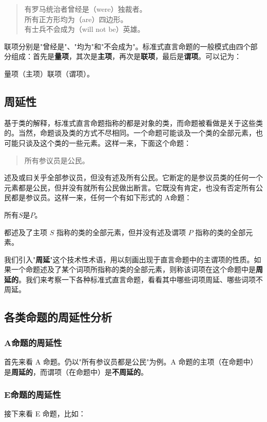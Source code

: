 \begin{quote}
有罗马统治者曾经是（were）独裁者。\\
所有正方形均为（are）四边形。\\
有士兵不会成为（will not be）英雄。
\end{quote}

联项分别是"曾经是"、"均为"和"不会成为"。标准式直言命题的一般模式由四个部分组成：首先是\textbf{量项}，其次是\textbf{主项}，再次是\textbf{联项}，最后是\textbf{谓项}。可以记为：

量项（主项）联项（谓项）。

\subsection{周延性}
基于类的解释，标准式直言命题指称的都是对象的类，而命题被看做是关于这些类的。当然，命题谈及类的方式不尽相同。一个命题可能谈及一个类的全部元素，也可能只谈及这个类的一些元素。这样一来，下面这个命题：

\begin{quote}
所有参议员是公民。
\end{quote}

述及或曰关乎全部参议员，但没有述及所有公民。它断定的是参议员类的任何一个元素都是公民，但并没有就所有公民做出断言。它既没有肯定，也没有否定所有公民都是参议员。这样一来，任何一个有如下形式的 A命题：

所有$S$是$P$。

都述及了主项 $S$ 指称的类的全部元素，但并没有述及谓项 $P$ 指称的类的全部元素。

我们引入"\textbf{周延}"这个技术性术语，用以刻画出现于直言命题中的主谓项的性质。如果一个命题述及了某个词项所指称的类的全部元素，则称该词项在这个命题中是\textbf{周延的}。我们来考察一下各种标准式直言命题，看看其中哪些词项周延、哪些词项不周延。

\subsection{各类命题的周延性分析}

\subsubsection{A命题的周延性}
首先来看 A 命题。仍以"所有参议员都是公民"为例。A 命题的主项（在命题中）是\textbf{周延的}，而谓项（在命题中）是\textbf{不周延的}。

\subsubsection{E命题的周延性}
接下来看 E 命题，比如：

